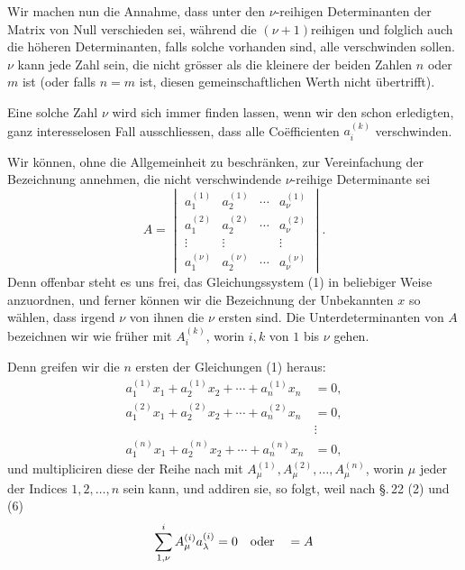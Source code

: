 
Wir machen nun die Annahme, dass unter den $\nu$-reihigen Determinanten der Matrix  von Null verschieden sei, während die $(\nu+1)$reihigen und folglich auch die höheren Determinanten, falls solche vorhanden sind, alle verschwinden sollen. $\nu$ kann jede Zahl sein, die nicht grösser als die kleinere der beiden Zahlen $n$ oder $m$ ist (oder falls $n=m$ ist, diesen gemeinschaftlichen Werth nicht übertrifft).

Eine solche Zahl $\nu$ wird sich immer finden lassen, wenn wir den schon erledigten, ganz interesselosen Fall ausschliessen, dass alle Coëfficienten $a_i^{(k)}$ verschwinden.

Wir können, ohne die Allgemeinheit zu beschränken, zur Vereinfachung der Bezeichnung annehmen, die nicht verschwindende $\nu$-reihige Determinante sei
\begin{equation}
 A=\begin{vmatrix}
 a_1^{(1)}&a_2^{(1)}&\cdots&a_\nu^{(1)}\\
 a_1^{(2)}&a_2^{(2)}&\cdots&a_\nu^{(2)}\\
 \vdots&\vdots&&\vdots\\
 a_1^{(\nu)}&a_2^{(\nu)}&\cdots&a_\nu^{(\nu)}
 \end{vmatrix}.
\tag{4}
\end{equation}
Denn offenbar steht es uns frei, das Gleichungssystem (1) in beliebiger Weise anzuordnen, und ferner können wir die Bezeichnung der Unbekannten $x$ so wählen, dass irgend $\nu$ von ihnen die $\nu$ ersten sind. Die Unterdeterminanten von $A$ bezeichnen wir wie früher mit $A_i^{(k)}$, worin $i,k$ von $1$ bis $\nu$ gehen.


Denn greifen wir die $n$ ersten der Gleichungen (1) heraus:
\begin{equation}
\begin{aligned}
 a_1^{(1)}x_1+a_2^{(1)}x_2+\cdots+a_n^{(1)}x_n&=0,\\
 a_1^{(2)}x_1+a_2^{(2)}x_2+\cdots+a_n^{(2)}x_n&=0,\\
 &\vdots\\
 a_1^{(n)}x_1+a_2^{(n)}x_2+\cdots+a_n^{(n)}x_n&=0,
\end{aligned}
\tag{5}
\end{equation}
und multipliciren diese der Reihe nach mit $A_\mu^{(1)},A_\mu^{(2)},\ldots,A_\mu^{(n)}$, worin $\mu$ jeder der Indices $1,2,\ldots,n$ sein kann, und addiren sie, so folgt, weil nach \S.\,22 (2) und (6)
\[
 \sum_{1,\nu}^{i} A_\mu^{(i)} a_\lambda^{(i)}=0 \quad\hbox{oder}\quad =A
\]
